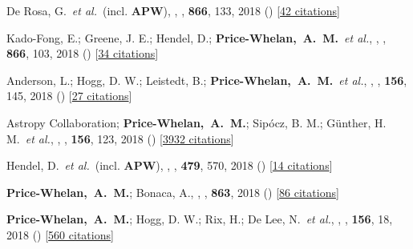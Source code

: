 \item[{\color{deemph}\scriptsize46}]De Rosa, G.~\textit{et al.}~(incl. \textbf{APW}), , \apj, \textbf{866}, 133, 2018 () [\href{http://adsabs.harvard.edu/abs/2018ApJ...866..133D}{42 citations}]

\item[{\color{deemph}\scriptsize45}]Kado-Fong, E.; Greene, J. E.; Hendel, D.; \textbf{Price-Whelan,~A.~M.}~\textit{et al.}, , \apj, \textbf{866}, 103, 2018 () [\href{http://adsabs.harvard.edu/abs/2018ApJ...866..103K}{34 citations}]

\item[{\color{deemph}\scriptsize44}]Anderson, L.; Hogg, D. W.; Leistedt, B.; \textbf{Price-Whelan,~A.~M.}~\textit{et al.}, , \aj, \textbf{156}, 145, 2018 () [\href{http://adsabs.harvard.edu/abs/2018AJ....156..145A}{27 citations}]

\item[{\color{deemph}\scriptsize43}]Astropy Collaboration; \textbf{Price-Whelan,~A.~M.}; Sip{\'{o}}cz, B. M.; G{\"u}nther, H. M.~\textit{et al.}, , \aj, \textbf{156}, 123, 2018 () [\href{http://adsabs.harvard.edu/abs/2018AJ....156..123A}{3932 citations}]

\item[{\color{deemph}\scriptsize42}]Hendel, D.~\textit{et al.}~(incl. \textbf{APW}), , \mnras, \textbf{479}, 570, 2018 () [\href{http://adsabs.harvard.edu/abs/2018MNRAS.479..570H}{14 citations}]

\item[{\color{deemph}\scriptsize41}]\textbf{Price-Whelan,~A.~M.}; Bonaca, A., , \apj, \textbf{863}, 2018 () [\href{http://adsabs.harvard.edu/abs/2018ApJ...863L..20P}{86 citations}]

\item[{\color{deemph}\scriptsize40}]\textbf{Price-Whelan,~A.~M.}; Hogg, D. W.; Rix, H.; De Lee, N.~\textit{et al.}, , \aj, \textbf{156}, 18, 2018 () [\href{http://adsabs.harvard.edu/abs/2018AJ....156...18P}{560 citations}]

